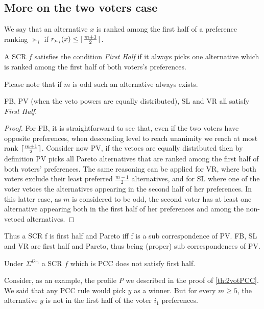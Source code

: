 \documentclass[version=3.21, pagesize, twoside=off, bibliography=totoc, DIV=calc, fontsize=12pt, a4paper]{scrartcl}
\begin{document}
\subsection{More on the two voters case}
 We say that an alternative $x$ is ranked among the first half of a preference ranking $\succ_i$ if $r_{\succ_i}(x) \leq \lceil\frac{m+1}{2}\rceil$.
 \begin{definition}
 	 A \ac{SCR} $f$ satisfies the condition \textit{First Half} if it always picks one  alternative which is ranked among the first half of both voters’s preferences.
 \end{definition}
Please note that if $m$ is odd such an alternative always exists.

\begin{proposition} FB, PV (when the veto powers are equally distributed), SL and VR all satisfy \textit{First Half}.
\end{proposition}
\begin{proof}
	For FB, it is straightforward to see that, even if the two voters have opposite preferences, when descending level to reach unanimity we reach at most rank $\lceil\frac{m+1}{2}\rceil$.
	Consider now PV, if the vetoes are equally distributed then by definition PV picks all Pareto alternatives that are ranked among the first half of both voters' preferences. 
	The same reasoning can be applied for VR, where both voters exclude their least preferred $\frac{m-1}{2}$ alternatives, and for SL where one of the voter vetoes the alternatives appearing in the second half of her preferences. In this latter case, as $m$ is considered to be odd, the second voter has at least one alternative appearing both in the first half of her preferences and among the non-vetoed alternatives.
\end{proof}

Thus a \ac{SCR} f is first half and Pareto iff f is a sub correspondence of PV.
FB, SL and VR are first half and Pareto, thus being (proper) sub correspondences of PV.

\begin{proposition} Under $\Sigma^{D_m}$ a \ac{SCR} $f$ which is PCC does not satisfy first half.
\end{proposition}
Consider, as an example, the profile $P$ we described in the proof of \cref{th:2votPCC}. We said that any PCC rule would pick $y$ as a winner. But for every $m\geq5$, the alternative $y$ is not in the first half of the voter $i_1$ preferences.
\end{document}
